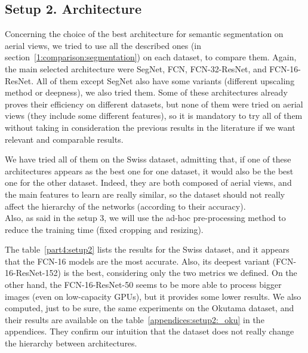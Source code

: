 \subsection*{Setup 2. Architecture}
Concerning the choice of the best architecture for semantic segmentation on aerial views, we tried to use all the described ones (in section~\ref{1:comparison:segmentation}) on each dataset, to compare them. Again, the main selected architecture were SegNet, FCN, FCN-32-ResNet, and FCN-16-ResNet. All of them except SegNet also have some variants (different upscaling method or deepness), we also tried them. Some of these architectures already proves their efficiency on different datasets, but none of them were tried on aerial views (they include some different features), so it is mandatory to try all of them without taking in consideration the previous results in the literature if we want relevant and comparable results.

We have tried all of them on the Swiss dataset, admitting that, if one of these architectures appears as the best one for one dataset, it would also be the best one for the other dataset. Indeed, they are both composed of aerial views, and the main features to learn are really similar, so the dataset should not really affect the hierarchy of the networks (according to their accuracy). \\
Also, as said in the setup 3, we will use the ad-hoc pre-processing method to reduce the training time (fixed cropping and resizing).

The table~\ref{part4:setup2} lists the results for the Swiss dataset, and it appears that the FCN-16 models are the most accurate. Also, its deepest variant (FCN-16-ResNet-152) is the best, considering only the two metrics we defined. On the other hand, the FCN-16-ResNet-50 seems to be more able to process bigger images (even on low-capacity GPUs), but it provides some lower results. We also computed, just to be sure, the same experiments on the Okutama dataset, and their results are available on the table~\ref{appendices:setup2:_oku} in the appendices. They confirm our intuition that the dataset does not really change the hierarchy between architectures.

